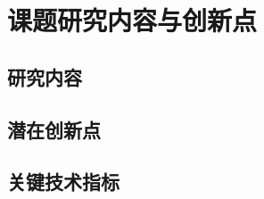 \chapter{课题研究内容与创新点}
\label{cha:content}
\section{研究内容}
\label{sec:research_content}

\section{潜在创新点}
\label{sec:innovation_points}

\section{关键技术指标}
\label{sec:metrics}
